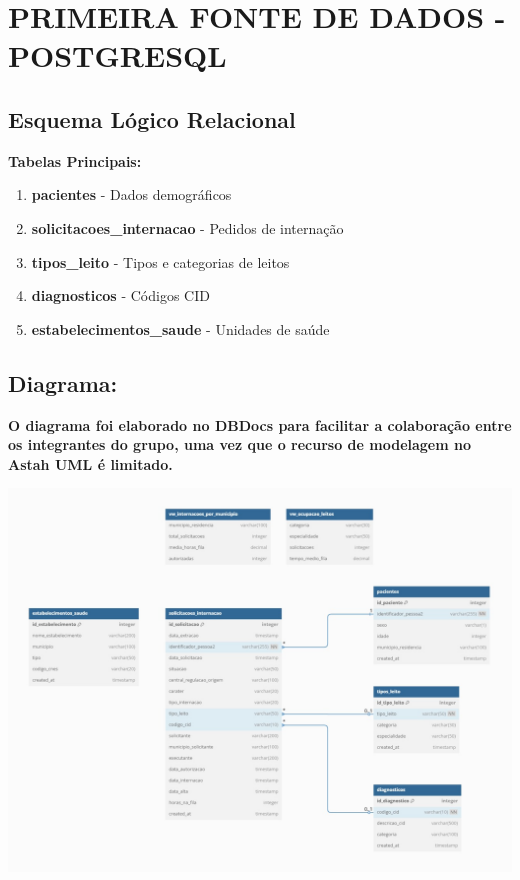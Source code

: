 \documentclass[12pt,a4paper]{article}
\begin{document}
\section{PRIMEIRA FONTE DE DADOS - POSTGRESQL}

\subsection{Esquema Lógico Relacional}

\textbf{Tabelas Principais:}
\begin{enumerate}
    \item \textbf{pacientes} - Dados demográficos
    \item \textbf{solicitacoes\_internacao} - Pedidos de internação
    \item \textbf{tipos\_leito} - Tipos e categorias de leitos
    \item \textbf{diagnosticos} - Códigos CID
    \item \textbf{estabelecimentos\_saude} - Unidades de saúde
\end{enumerate}

\subsection{Diagrama:}

\textbf{O diagrama foi elaborado no DBDocs para facilitar a colaboração entre os integrantes do grupo, uma vez que o recurso de modelagem no Astah UML é limitado.}

\begin{center}
    \includegraphics[width=1.0\textwidth]{RELACIONAL_ER_DIAGRAMA.jpg}
\end{center}
\end{document}
